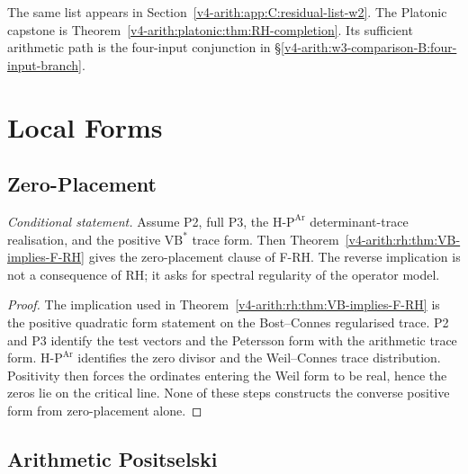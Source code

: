 The same list appears in
Section~\ref{v4-arith:app:C:residual-list-w2}.  The Platonic capstone is
Theorem~\ref{v4-arith:platonic:thm:RH-completion}.  Its sufficient arithmetic
path is the four-input conjunction in
\S\ref{v4-arith:w3-comparison-B:four-input-branch}.

\section{Local Forms}
\label{v4-arith:w3-comparison-B:correction-summary}

\subsection{Zero-Placement}
\label{v4-arith:w3-comparison-B:correction-23}

\begin{proposition}
\emph{Conditional statement.} Assume P2, full P3, the
\(\mathrm{H}\text{-}\mathrm{P}^{\mathrm{Ar}}\) determinant-trace realisation,
and the positive \(\mathrm{VB}^{*}\) trace form.  Then
Theorem~\ref{v4-arith:rh:thm:VB-implies-F-RH} gives the zero-placement clause
of F-RH.  The reverse implication is not a consequence of RH; it asks
for spectral regularity of the operator model.
\end{proposition}

\begin{proof}
The implication used in
Theorem~\ref{v4-arith:rh:thm:VB-implies-F-RH} is the positive quadratic form
statement on the Bost--Connes regularised trace.  P2 and P3 identify
the test vectors and the Petersson form with the arithmetic trace
form.  \(\mathrm{H}\text{-}\mathrm{P}^{\mathrm{Ar}}\) identifies the
zero divisor and the Weil--Connes trace distribution.  Positivity then
forces the ordinates entering the Weil form to be real, hence the zeros
lie on the critical line.  None of these steps constructs the converse
positive form from zero-placement alone.
\end{proof}

\subsection{Arithmetic Positselski}
\label{v4-arith:w3-comparison-B:correction-25}

